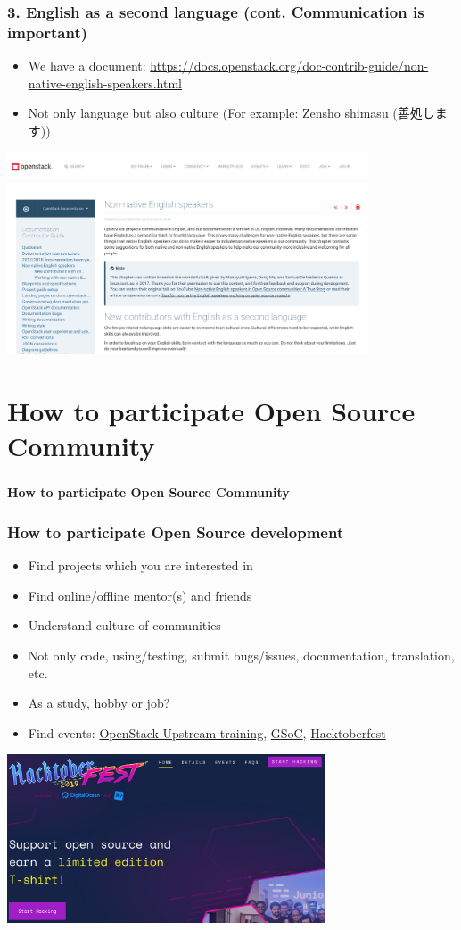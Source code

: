 \documentclass[aspectratio=169,11pt,hyperref={colorlinks=true}]{beamer}
\begin{document}
\begin{frame}
  \frametitle{3. English as a second language (cont. Communication is important)}
  \begin{itemize}
    \item We have a document: \url{https://docs.openstack.org/doc-contrib-guide/non-native-english-speakers.html}
    \item Not only language but also culture (For example: Zensho shimasu (善処します))
  \end{itemize}
  \centering\includegraphics[height=60mm]{images/non-native-english-speakers.png}
\end{frame}

\section{How to participate Open Source Community}
\begin{frame}
  \frametitle{ }
  \Huge{\bf{How to participate Open Source Community}}
\end{frame}

\begin{frame}
  \frametitle{How to participate Open Source development}
  \begin{itemize}
    \item Find projects which you are interested in
    \item Find online/offline mentor(s) and friends
    \item Understand culture of communities
    \item Not only code, using/testing, submit bugs/issues, documentation, translation, etc.
    \item As a study, hobby or job?
    \item Find events: \href{https://docs.openstack.org/upstream-training/#upcoming-trainings}{OpenStack Upstream training},
     \href{https://summerofcode.withgoogle.com/}{GSoC},
     \href{https://hacktoberfest.digitalocean.com/}{Hacktoberfest}
  \end{itemize}
  \centering\includegraphics[height=50mm]{images/hacktoberfest.png}
\end{frame}
\end{document}
